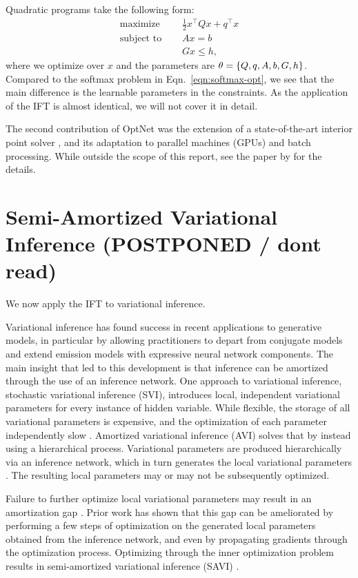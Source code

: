 \documentclass[11pt]{article}
\begin{document}
Quadratic programs take the following form:
\begin{equation}
\label{eqn:qp}
\begin{aligned}
\textrm{maximize } \quad & \frac12 x^\top Q x + q^\top x\\
\textrm{subject to } \quad & Ax = b\\
& Gx \leq h,
\end{aligned}
\end{equation}
where we optimize over $x$ and the parameters are $\theta = \left\{Q, q, A, b, G, h\right\}$.
Compared to the softmax problem in Eqn.~\ref{eqn:softmax-opt},
we see that the main difference is the learnable parameters in the constraints.
As the application of the IFT is almost identical, we will not cover it in detail.

The second contribution of OptNet was the extension of a state-of-the-art interior point
solver \citep{optnet}, and its adaptation to parallel machines (GPUs) and batch processing.
While outside the scope of this report, see the paper by \citet{optnet} for the details.

\section{Semi-Amortized Variational Inference (POSTPONED / dont read)}
We now apply the IFT to variational inference.

Variational inference has found success in recent applications to generative models,
in particular by allowing practitioners to depart from conjugate models
and extend emission models with expressive neural network components.
The main insight that led to this development is that inference can be amortized through
the use of an inference network.
One approach to variational inference, stochastic variational inference (SVI),
introduces local, independent variational parameters for every instance of hidden variable.
While flexible, the storage of all variational parameters is expensive, and the optimization
of each parameter independently slow \citep{}.
Amortized variational inference (AVI) solves that by instead using a hierarchical process.
Variational parameters are produced hierarchically via an inference network,
which in turn generates the local variational parameters \citep{}.
The resulting local parameters may or may not be subsequently optimized.

Failure to further optimize local variational parameters may result in an amortization gap \citep{}.
Prior work has shown that this gap can be ameliorated by performing a few steps of
optimization on the generated local parameters obtained from the inference network,
and even by propagating gradients through the optimization process.
Optimizing through the inner optimization problem results in semi-amortized variational inference
(SAVI) \citep{}.
\end{document}
